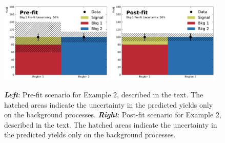 \begin{figure}[!htb]
    \begin{center}
        \includegraphics[width=0.48\textwidth]{figures/common_ana/stat_hypo/profile_examples/profile_ex_2_pre}
        \includegraphics[width=0.48\textwidth]{figures/common_ana/stat_hypo/profile_examples/profile_ex_2_post}
        \caption{
            \textbf{\textit{Left}}: Pre-fit scenario for Example 2, described in the text. 
                The hatched areas indicate the uncertainty in the predicted yields only on the background processes.
            \textbf{\textit{Right}}: Post-fit scenario for Example 2, described in the text.
                The hatched areas indicate the uncertainty in the predicted yields only on the background processes.
        }
        \label{fig:prof_ex_2_pre}
    \end{center}
\end{figure}


